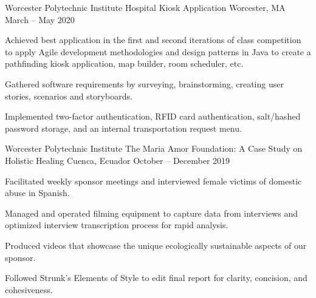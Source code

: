 

\begin{cventries}

  \cventry
    {Worcester Polytechnic Institute} %
    {Hospital Kiosk Application } %
    {Worcester, MA} %
    {March – May 2020} %
    {
      \begin{cvitems} %
       \item {Achieved best application in the first and second iterations of class competition to apply Agile development methodologies and
        design patterns in Java to create a pathfinding kiosk application, map builder, room scheduler, etc.}
        \item {Gathered software requirements by surveying, brainstorming, creating user stories, scenarios and storyboards.}
        \item {Implemented two-factor authentication, RFID card authentication, salt/hashed password storage, and an internal transportation request menu.}
      \end{cvitems}
    }


  \cventry
    {Worcester Polytechnic Institute} %
    {The Maria Amor Foundation: A Case Study on Holistic Healing} %
    {Cuenca, Ecuador} %
    {October – December 2019} %
    {
      \begin{cvitems} %
        \item {Facilitated weekly sponsor meetings and interviewed female victims of domestic abuse in Spanish.}
        \item {Managed and operated filming equipment to capture data from
        interviews and optimized interview transcription process for rapid analysis.}
        \item {Produced videos that showcase the unique ecologically sustainable aspects of our sponsor.}
        \item {Followed
        Strunk’s Elements of Style to edit final report for clarity, concision, and cohesiveness.}
      \end{cvitems}
    }

\end{cventries}
